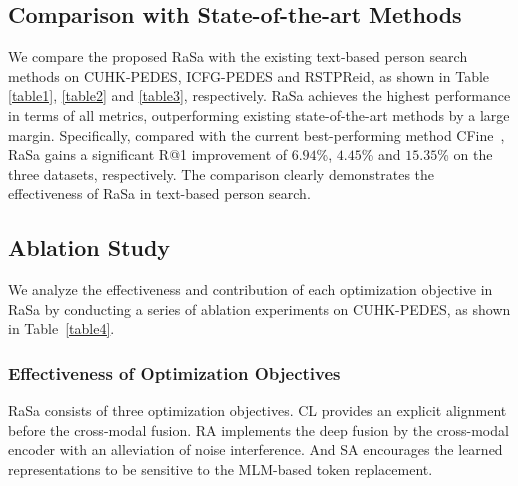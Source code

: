 \documentclass{article}
\begin{document}
\subsection{Comparison with State-of-the-art Methods}
We compare the proposed RaSa with the existing text-based person search methods on CUHK-PEDES, ICFG-PEDES and RSTPReid, as shown in Table \ref{table1}, \ref{table2} and \ref{table3}, respectively.    
RaSa achieves the highest performance in terms of all metrics, outperforming existing state-of-the-art methods by a large margin. 
Specifically, compared with the current best-performing method CFine~\cite{yan2022clip}, RaSa gains a significant R@1 improvement of $6.94$\%, $4.45$\% and $15.35$\% on the three datasets, respectively.
The comparison clearly demonstrates the effectiveness of RaSa in text-based person search.


\subsection{Ablation Study}

We analyze the effectiveness and contribution of each optimization objective in RaSa by conducting a series of ablation experiments on CUHK-PEDES, as shown in Table~\ref{table4}.


\subsubsection{Effectiveness of Optimization Objectives}
RaSa consists of three optimization objectives. CL provides an explicit alignment before the cross-modal fusion. RA implements the deep fusion by the cross-modal encoder with an alleviation of noise interference. And SA encourages the learned representations to be sensitive to the MLM-based token replacement.
\end{document}
